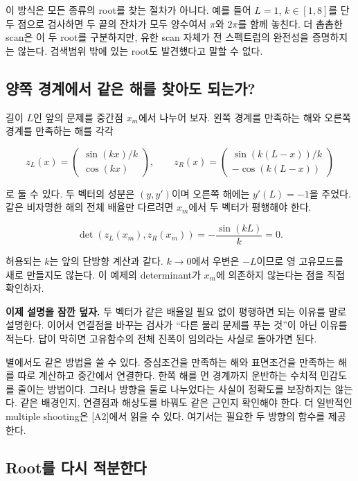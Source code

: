 \documentclass[
  10pt,
  a4paper,
]{article}
\begin{document}
이 방식은 모든 종류의 root를 찾는 절차가 아니다. 예를 들어 \(L=1\),
\(k\in[1,8]\)를 단 두 점으로 검사하면 두 끝의 잔차가 모두 양수여서
\(\pi\)와 \(2\pi\)를 함께 놓친다. 더 촘촘한 scan은 이 두 root를
구분하지만, 유한 scan 자체가 전 스펙트럼의 완전성을 증명하지는 않는다.
검색범위 밖에 있는 root도 발견했다고 말할 수 없다.

\subsection{양쪽 경계에서 같은 해를 찾아도
되는가?}\label{uxc591uxcabd-uxacbduxacc4uxc5d0uxc11c-uxac19uxc740-uxd574uxb97c-uxcc3euxc544uxb3c4-uxb418uxb294uxac00}

길이 \(L\)인 앞의 문제를 중간점 \(x_m\)에서 나누어 보자. 왼쪽 경계를
만족하는 해와 오른쪽 경계를 만족하는 해를 각각

\[
z_L(x)=\begin{pmatrix}\sin(kx)/k\\ \cos(kx)\end{pmatrix},\qquad
z_R(x)=\begin{pmatrix}\sin(k(L-x))/k\\ -\cos(k(L-x))\end{pmatrix}
\]

로 둘 수 있다. 두 벡터의 성분은 \((y,y')\)이며 오른쪽 해에는
\(y'(L)=-1\)을 주었다. 같은 비자명한 해의 전체 배율만 다르려면
\(x_m\)에서 두 벡터가 평행해야 한다.

\[
\det(z_L(x_m),z_R(x_m))=-\frac{\sin(kL)}{k}=0.
\]

허용되는 \(k\)는 앞의 단방향 계산과 같다. \(k\to0\)에서 우변은
\(-L\)이므로 영 고유모드를 새로 만들지도 않는다. 이 예제의 determinant가
\(x_m\)에 의존하지 않는다는 점을 직접 확인하자.

\textbf{이제 설명을 잠깐 덮자.} 두 벡터가 같은 배율일 필요 없이 평행하면
되는 이유를 말로 설명한다. 이어서 연결점을 바꾸는 검사가 ``다른 물리
문제를 푸는 것''이 아닌 이유를 적는다. 답이 막히면 고유함수의 전체
진폭이 임의라는 사실로 돌아가면 된다.

별에서도 같은 방법을 쓸 수 있다. 중심조건을 만족하는 해와 표면조건을
만족하는 해를 따로 계산하고 중간에서 연결한다. 한쪽 해를 먼 경계까지
운반하는 수치적 민감도를 줄이는 방법이다. 그러나 방향을 둘로 나누었다는
사실이 정확도를 보장하지는 않는다. 같은 배경인지, 연결점과 해상도를
바꿔도 같은 근인지 확인해야 한다. 더 일반적인 multiple shooting은
{[}A2{]}에서 읽을 수 있다. 여기서는 필요한 두 방향의 함수를 제공한다.

\subsection{Root를 다시
적분한다}\label{rootuxb97c-uxb2e4uxc2dc-uxc801uxbd84uxd55cuxb2e4}
\end{document}
